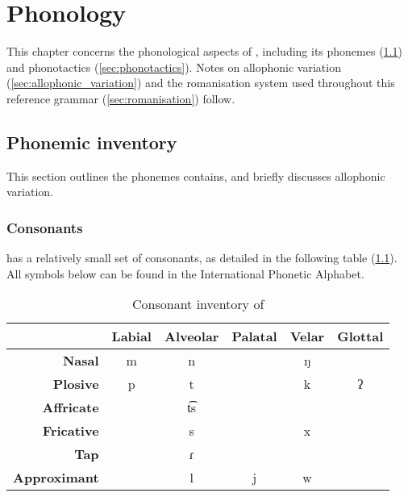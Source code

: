 \chapter{Phonology}
\label{cha:phonology}

This chapter concerns the phonological aspects of \langname, including its
phonemes (\cref{sec:inventory}) and phonotactics (\cref{sec:phonotactics}). Notes
on allophonic variation (\cref{sec:allophonic_variation}) and the romanisation
system used throughout this reference grammar (\cref{sec:romanisation}) follow.


\section{Phonemic inventory}
\label{sec:inventory}
This section outlines the phonemes \langname{} contains, and briefly discusses
allophonic variation.

\subsection{Consonants}
\langname{} has a relatively small set of consonants, as detailed in the following
table (\cref{tab:consonants}). All symbols below can be found in the International Phonetic
Alphabet.

\begin{table}[htbp]
  \centering
  \begin{tabular}{r c c c c c}
    \toprule
    & \textbf{Labial} & \textbf{Alveolar} & \textbf{Palatal} & \textbf{Velar} & \textbf{Glottal} \\
    \midrule
    \textbf{Nasal} & m & n & & ŋ & \\
    \textbf{Plosive} & p & t & & k & ʔ \\
    \textbf{Affricate} & & t͡s & & & \\
    \textbf{Fricative} & & s & & x & \\
    \textbf{Tap} & & ɾ & & & \\
    \textbf{Approximant} & & l & j & w & \\
    \bottomrule
  \end{tabular}
  \caption{Consonant inventory of \langname{}}
  \label{tab:consonants}
\end{table}

